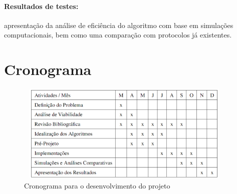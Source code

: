  \subsubsection{Resultados de testes:} apresentação da análise de eficiência do algoritmo com base em simulações computacionais, bem como uma comparação com protocolos já existentes.
 
 \chapter{Cronograma}
 
\begin{figure}[!htb]
\centering
\includegraphics[width=400px,height=180px]{./Pictures/cronograma.png}
\caption{Cronograma para o desenvolvimento do projeto} %
\label{fig:cronograma} %
\end{figure}